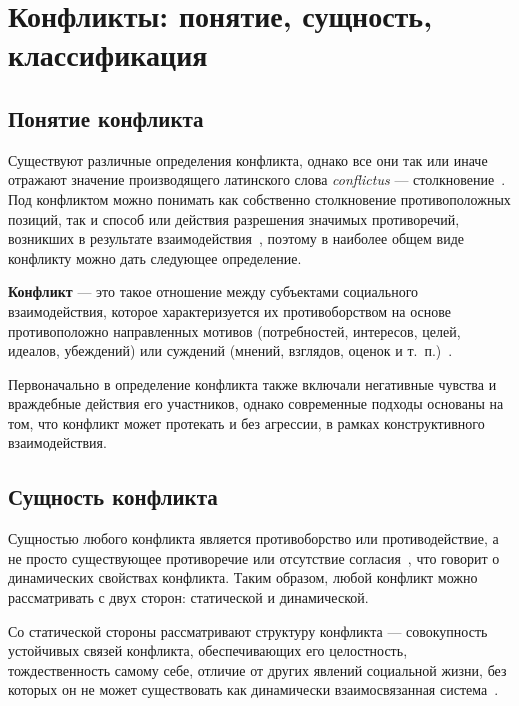 \chapter{Конфликты: понятие, сущность, классификация}

\section{Понятие конфликта}

Существуют различные определения конфликта, однако все они так или иначе
отражают значение производящего латинского слова \textit{conflictus} ---
столкновение~\cite{book06}. Под конфликтом можно понимать как собственно
столкновение противоположных позиций, так и способ или действия разрешения
значимых противоречий, возникших в результате взаимодействия~\cite{book04},
поэтому в наиболее общем виде конфликту можно дать следующее определение.

\textbf{Конфликт} --- это такое отношение между субъектами социального
взаимодействия, которое характеризуется их противоборством на основе
противоположно направленных мотивов (потребностей, интересов, целей, идеалов,
убеждений) или суждений (мнений, взглядов, оценок и т.~п.)~\cite{book03}.

Первоначально в определение конфликта также включали негативные чувства и
враждебные действия его участников, однако современные подходы основаны на том,
что конфликт может протекать и без агрессии, в рамках конструктивного
взаимодействия.

\section{Сущность конфликта}

Сущностью любого конфликта является противоборство или противодействие, а не
просто существующее противоречие или отсутствие согласия~\cite{book07}, что говорит о
динамических свойствах конфликта. Таким образом, любой конфликт можно
рассматривать с двух сторон: статической и динамической.

Со статической стороны рассматривают структуру конфликта --- совокупность
устойчивых связей конфликта, обеспечивающих его целостность, тождественность
самому себе, отличие от других явлений социальной жизни, без которых он
не может существовать как динамически взаимосвязанная
система~\cite{book04}.


